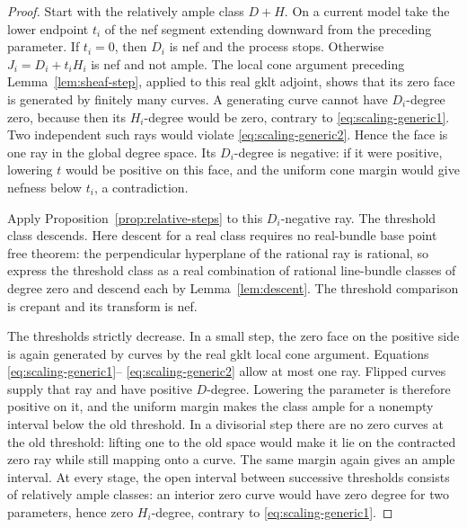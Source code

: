 \begin{proof}
Start with the relatively ample class $D+H$.  On a current model
take the lower endpoint $t_i$ of the nef segment extending downward
from the preceding parameter.  If $t_i=0$, then $D_i$ is nef and
the process stops.  Otherwise $J_i=D_i+t_iH_i$ is nef and not ample.
The local cone argument preceding Lemma~\ref{lem:sheaf-step}, applied
to this real gklt adjoint, shows that its zero face is generated by
finitely many curves.  A generating curve cannot have $D_i$-degree
zero, because then its $H_i$-degree would be zero, contrary to
\eqref{eq:scaling-generic1}.  Two independent such rays would violate
\eqref{eq:scaling-generic2}.  Hence the face is one ray in the global
degree space.  Its $D_i$-degree is negative: if it were positive,
lowering $t$ would be positive on this face, and the uniform cone
margin would give nefness below $t_i$, a contradiction.

Apply Proposition~\ref{prop:relative-steps} to this $D_i$-negative
ray.  The threshold class descends.  Here descent for a real class
requires no real-bundle base point free theorem: the perpendicular
hyperplane of the rational ray is rational, so express the threshold
class as a real combination of rational line-bundle classes of degree
zero and descend each by Lemma~\ref{lem:descent}.  The threshold
comparison is crepant and its transform is nef.

The thresholds strictly decrease.  In a small step, the zero face on
the positive side is again generated by curves by the real gklt
local cone argument.  Equations \eqref{eq:scaling-generic1}--
\eqref{eq:scaling-generic2} allow at most one ray.  Flipped curves
supply that ray and have positive $D$-degree.  Lowering the parameter
is therefore positive on it, and the uniform margin makes the class
ample for a nonempty interval below the old threshold.  In a
divisorial step there are no zero curves at the old threshold:
lifting one to the old space would make it lie on the contracted
zero ray while still mapping onto a curve.  The same margin again
gives an ample interval.  At every stage, the open interval between
successive thresholds consists of relatively ample classes: an
interior zero curve would have zero degree for two parameters, hence
zero $H_i$-degree, contrary to \eqref{eq:scaling-generic1}.


\end{proof}
